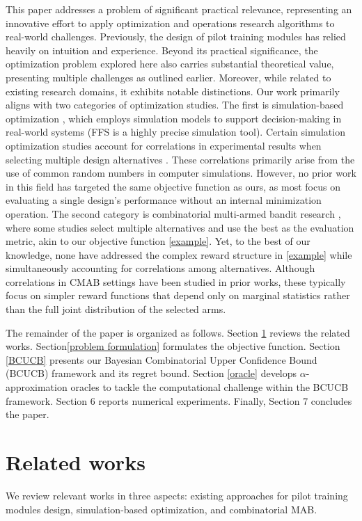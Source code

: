 \documentclass[opre,sglanonrev]{informs4}
\begin{document}
This paper addresses a problem of significant practical relevance, representing an innovative effort to apply optimization and operations research algorithms to real-world challenges. Previously, the design of pilot training modules has relied heavily on intuition and experience. Beyond its practical significance, the optimization problem explored here also carries substantial theoretical value, presenting multiple challenges as outlined earlier. Moreover, while related to existing research domains, it exhibits notable distinctions. Our work primarily aligns with two categories of optimization studies. The first is simulation-based optimization \citep{Fu2015}, which employs simulation models to support decision-making in real-world systems (FFS is a highly precise simulation tool). Certain simulation optimization studies account for correlations in experimental results when selecting multiple design alternatives \citep{xie2016bayesian}. These correlations primarily arise from the use of common random numbers in computer simulations. However, no prior work in this field has targeted the same objective function as ours, as most focus on evaluating a single design’s performance without an internal minimization operation. The second category is combinatorial multi-armed bandit research \citep{Chen2013}, where some studies select multiple alternatives and use the best as the evaluation metric, akin to our objective function \eqref{example}. Yet, to the best of our knowledge, none have addressed the complex reward structure in \eqref{example} while simultaneously accounting for correlations among alternatives. Although correlations in CMAB settings have been studied in prior works, these typically focus on simpler reward functions that depend only on marginal statistics rather than the full joint distribution of the selected arms. 

The remainder of the paper is organized as follows. Section \ref{related works} reviews the related works. Section\ref{problem formulation} formulates the objective function. Section \ref{BCUCB} presents our Bayesian Combinatorial Upper Confidence Bound (BCUCB) framework and its regret bound. Section \ref{oracle} develops $\alpha$-approximation oracles to tackle the computational challenge within the BCUCB framework. Section 6 reports numerical experiments. Finally, Section 7 concludes the paper.

\section{Related works}
\label{related works}
We review relevant works in three aspects: existing approaches for pilot training modules design, simulation-based optimization, and combinatorial MAB.
\end{document}
